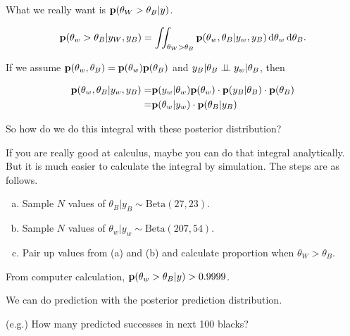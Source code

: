 What we really want is ${\mathbf p}(\theta_W > \theta_B | y)$.

\[
{\mathbf p}(\theta_w > \theta_B | y_W, y_B) = \iint_{\theta_W > \theta_B} {\mathbf p}(\theta_w, \theta_B| y_w, y_B) \mathop{}\!\mathrm{d} \theta_w \mathop{}\!\mathrm{d} \theta_B.
\]

If we assume ${\mathbf p}(\theta_w, \theta_B) = {\mathbf p}(\theta_w) {\mathbf p}(\theta_B)$ and $y_B|\theta_B \perp \!\!\! \perp y_w| \theta_B$, then

\begin{align*}
    {\mathbf p}(\theta_w, \theta_B | y_w, y_B) 
    =& {\mathbf p}(y_w| \theta_w){\mathbf p}(\theta_w) \cdot {\mathbf p}(y_B| \theta_B) \cdot {\mathbf p}(\theta_B)\\
    =& {\mathbf p}(\theta_w| y_w) \cdot {\mathbf p}(\theta_B| y_B)
\end{align*}

So how do we do this integral with these posterior distribution?

If you are really good at calculus, maybe you can do that integral analytically. But it is much easier to calculate the integral by simulation. The steps are as follows. 

\begin{enumerate}[(a)]
    \item Sample $N$ values of $\theta_B|y_B \sim \text{Beta}(27, 23)$.
    \item Sample $N$ values of $\theta_w|y_w \sim \text{Beta}(207, 54)$.
    \item Pair up values from (a) and (b) and calculate proportion when $\theta_W > \theta_B$.
\end{enumerate}

From computer calculation, ${\mathbf p}(\theta_w > \theta_B| y) > 0.9999$.

We can do prediction with the posterior prediction distribution.

(e.g.) How many predicted successes in next 100 blacks?


% 